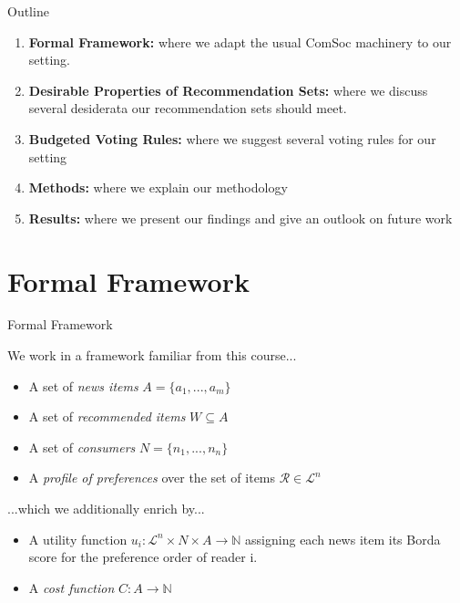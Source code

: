 \documentclass{beamer}
\begin{document}
\begin{frame}{Outline}
	
\begin{enumerate}
	\item \textbf{Formal Framework:} where we adapt the usual ComSoc machinery to our setting.
	\item \textbf{Desirable Properties of Recommendation Sets:} where we discuss several desiderata our recommendation sets should meet.
	\item \textbf{Budgeted Voting Rules:} where we suggest several voting rules for our setting
	\item \textbf{Methods:} where we explain our methodology
	\item \textbf{Results:} where we present our findings and give an outlook on future work 
\end{enumerate}	
	
	
\end{frame}
	
\section{Formal Framework}

\begin{frame}{Formal Framework}
	
We work in a framework familiar from this course...
\begin{itemize}

	
\item A set of \emph {news items} $A=\{a_1,...,a_m\}$
\item A set of \emph {recommended items} $W\subseteq A$
\item A set of \emph {consumers} $N=\{n_1,...,n_n\}$
\item A \emph {profile of preferences} over the set of items
 $\mathcal{R}\in \mathcal{L}^n$

\end{itemize}

...which we additionally enrich by...
\begin{itemize}
	\item A utility function $u_i:\mathcal{L}^n \times N \times  A \rightarrow \mathbb{N}$ assigning each news item its Borda score for the preference order of reader i.
	\item A \emph{cost function} $C: A \rightarrow \mathbb {N}$
\end{itemize}

\end{frame}
\end{document}
